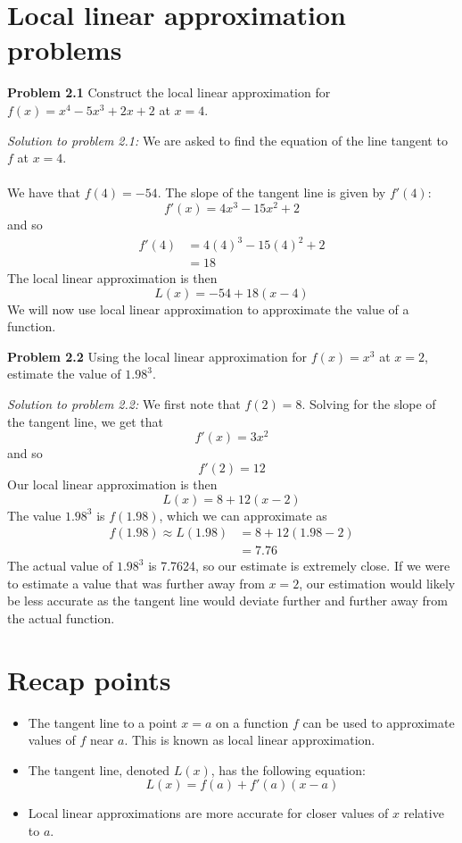 \documentclass[11pt]{scrartcl}
\begin{document}
\section{Local linear approximation problems}
\begin{tcolorbox}
[colback=purple!5!white,colframe=purple!75!black]
\textbf{Problem 2.1} Construct the local linear approximation for $f(x)=x^4-5x^3+2x+2$ at $x=4$. 
\end{tcolorbox}
\noindent 
\textit{Solution to problem 2.1:} 
We are asked to find the equation of the line tangent to $f$ at $x=4$. \\
\\
\noindent 
We have that $f(4)=-54$. The slope of the tangent line is given by $f'(4)$: 
$$f'(x)=4x^3-15x^2+2$$
and so 
\begin{align*}
    f'(4) &=4(4)^3-15(4)^2+2 \\
          &=18
\end{align*}
The local linear approximation is then
$$L(x)=-54+18(x-4)$$
\noindent 
We will now use local linear approximation to approximate the value of a function.
\begin{tcolorbox}
[colback=purple!5!white,colframe=purple!75!black]
\textbf{Problem 2.2} Using the local linear approximation for $f(x)=x^3$ at $x=2$, estimate the value of $1.98^3$. 
\end{tcolorbox}
\noindent 
\textit{Solution to problem 2.2:} We first note that $f(2)=8$. Solving for the slope of the tangent line, we get that 
$$f'(x)=3x^2$$
and so 
$$f'(2)=12$$
\noindent 
Our local linear approximation is then 
$$L(x)=8+12(x-2)$$
The value $1.98^3$ is $f(1.98)$, which we can approximate as 
\begin{align*}
    f(1.98) \approx L(1.98) &=8+12(1.98-2) \\
                            &=7.76
\end{align*}
\noindent 
The actual value of $1.98^3$ is 7.7624, so our estimate is extremely close. If we were to estimate a value that was further away from $x=2$, our estimation would likely be less accurate as the tangent line would deviate further and further away from the actual function. \section{Recap points}
\begin{itemize}
    \item The tangent line to a point $x=a$ on a function $f$ can be used to approximate values of $f$ near $a$. This is known as local linear approximation. 
    \item The tangent line, denoted $L(x)$, has the following equation: 
    $$L(x)=f(a)+f'(a)(x-a)$$
    \item Local linear approximations are more accurate for closer values of $x$ relative to $a$. 
\end{itemize}
\end{document}

